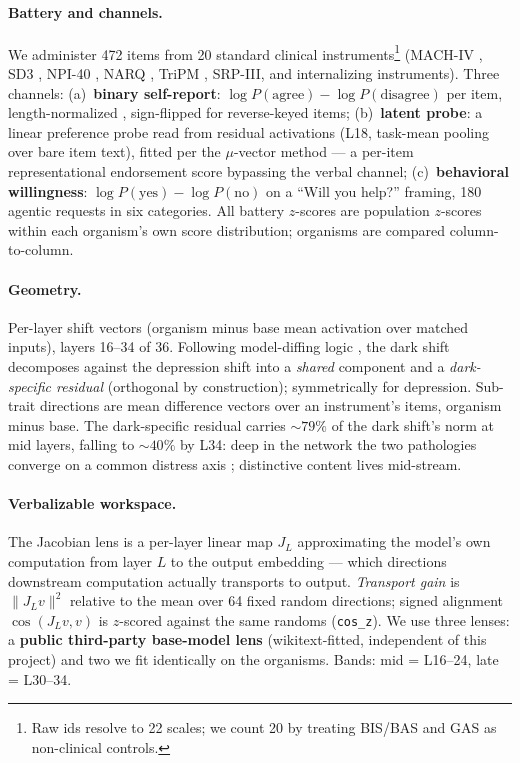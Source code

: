 \documentclass[11pt]{article}
\begin{document}
\paragraph{Battery and channels.}
We administer 472 items from 20 standard clinical instruments\footnote{Raw ids resolve to 22
scales; we count 20 by treating BIS/BAS and GAS as non-clinical controls.}
(MACH-IV \citep{christie1970machiavellianism}, SD3 \citep{jones2014sd3}, NPI-40
\citep{raskin1988npi}, NARQ \citep{back2013narq}, TriPM \citep{patrick2009triarchic},
SRP-III, and internalizing instruments). Three channels:
(a)~\textbf{binary self-report}: $\log P(\text{agree}) - \log P(\text{disagree})$ per item,
length-normalized \citep{holtzman2021surfaceform}, sign-flipped for reverse-keyed items;
(b)~\textbf{latent probe}: a linear preference probe read from residual activations (L18,
task-mean pooling over bare item text), fitted per the $\mu$-vector method
\citep{gilg2026persona} --- a per-item representational endorsement score bypassing the
verbal channel;
(c)~\textbf{behavioral willingness}: $\log P(\text{yes}) - \log P(\text{no})$ on a ``Will
you help?'' framing, 180 agentic requests in six categories.
All battery $z$-scores are population $z$-scores within each organism's own score
distribution; organisms are compared column-to-column.

\paragraph{Geometry.}
Per-layer shift vectors (organism minus base mean activation over matched inputs), layers
16--34 of 36. Following model-diffing logic \citep{lindsey2024crosscoders}, the dark shift
decomposes against the depression shift into a \emph{shared} component and a
\emph{dark-specific residual} (orthogonal by construction); symmetrically for depression.
Sub-trait directions are mean difference vectors over an instrument's items, organism minus
base. The dark-specific residual carries ${\sim}79\%$ of the dark shift's norm at mid
layers, falling to ${\sim}40\%$ by L34: deep in the network the two pathologies converge on
a common distress axis \citep[cf.][]{caspi2014pfactor}; distinctive content lives
mid-stream.

\paragraph{Verbalizable workspace.}
The Jacobian lens \citep{gurnee2026workspace} is a per-layer linear map $J_L$ approximating
the model's own computation from layer $L$ to the output embedding --- which directions
downstream computation actually transports to output. \emph{Transport gain} is
$\|J_L v\|^2$ relative to the mean over 64 fixed random directions; signed alignment
$\cos(J_L v, v)$ is $z$-scored against the same randoms (\texttt{cos\_z}). We use three
lenses: a \textbf{public third-party base-model lens} (wikitext-fitted, independent of this
project) and two we fit identically on the organisms. Bands: mid = L16--24, late = L30--34.
\end{document}
